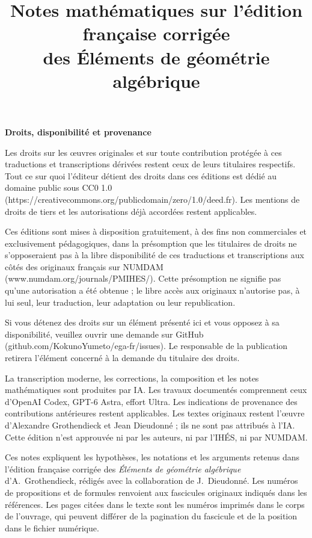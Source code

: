 \documentclass[11pt,a4paper]{article}
\title{Notes mathématiques sur l'édition française corrigée\protect\\des Éléments de géométrie algébrique}
\author{}
\date{}
\begin{document}
\clearpage
\begingroup
\small
\noindent\textbf{Droits, disponibilité et provenance}

Les droits sur les œuvres originales et sur toute contribution protégée à ces traductions et transcriptions dérivées restent ceux de leurs titulaires respectifs. Tout ce sur quoi l'éditeur détient des droits dans ces éditions est dédié au domaine public sous CC0 1.0 (https://creativecommons.org/publicdomain/zero/1.0/deed.fr). Les mentions de droits de tiers et les autorisations déjà accordées restent applicables.

Ces éditions sont mises à disposition gratuitement, à des fins non commerciales et exclusivement pédagogiques, dans la présomption que les titulaires de droits ne s'opposeraient pas à la libre disponibilité de ces traductions et transcriptions aux côtés des originaux français sur NUMDAM (www.numdam.org/journals/PMIHES/). Cette présomption ne signifie pas qu'une autorisation a été obtenue ; le libre accès aux originaux n'autorise pas, à lui seul, leur traduction, leur adaptation ou leur republication.

Si vous détenez des droits sur un élément présenté ici et vous opposez à sa disponibilité, veuillez ouvrir une demande sur GitHub (github.com/KokunoYumeto/ega-fr/issues). Le responsable de la publication retirera l'élément concerné à la demande du titulaire des droits.

La transcription moderne, les corrections, la composition et les notes mathématiques sont produites par IA. Les travaux documentés comprennent ceux d'OpenAI Codex, GPT-6 Astra, effort Ultra. Les indications de provenance des contributions antérieures restent applicables. Les textes originaux restent l'œuvre d'Alexandre Grothendieck et Jean Dieudonné ; ils ne sont pas attribués à l'IA. Cette édition n'est approuvée ni par les auteurs, ni par l'IHÉS, ni par NUMDAM.
\par
\endgroup
\clearpage

\maketitle
Ces notes expliquent les hypothèses, les notations et les arguments
retenus dans l'édition française corrigée des \emph{Éléments de
géométrie algébrique} d'A.~Grothendieck, rédigés avec la collaboration
de J.~Dieudonné. Les numéros de propositions et de formules renvoient
aux fascicules originaux indiqués dans les références.
Les pages citées dans le texte sont les numéros imprimés dans le
corps de l'ouvrage, qui peuvent différer de la pagination du fascicule
et de la position dans le fichier numérique.
\end{document}
